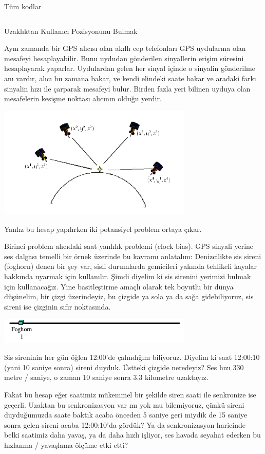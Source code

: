 \documentclass[12pt,fleqn]{article}\usepackage{../../common}
\begin{document}
Tüm kodlar

\inputminted[fontsize=\footnotesize]{python}{orbital.py}

Uzaklıktan Kullanıcı Pozisyonunu Bulmak

Aynı zamanda bir GPS alıcısı olan akıllı cep telefonları GPS uydularına
olan mesafeyi hesaplayabilir. Bunu uydudan gönderilen sinyallerin erişim
süresini hesaplayarak yaparlar. Uydulardan gelen her sinyal içinde o
sinyalin gönderilme anı vardır, alıcı bu zamana bakar, ve kendi elindeki
saate bakar ve aradaki farkı sinyalin hızı ile çarparak mesafeyi
bulur. Birden fazla yeri bilinen uyduya olan mesafelerin kesişme noktası
alıcının olduğu yerdir. 

\includegraphics[width=25em]{trilat1.png}

Yanlız bu hesap yapılırken iki potansiyel problem ortaya çıkar. 

Birinci problem alıcıdaki saat yanlılık problemi (clock bias). GPS sinyali
yerine ses dalgası temelli bir örnek üzerinde bu kavramı anlatalım:
Denizcilikte sis sireni (foghorn) denen bir şey var, sisli durumlarda
gemicileri yakında tehlikeli kayalar hakkında uyarmak için
kullanılır. Şimdi diyelim ki sis sirenini yerimizi bulmak için
kullanacağız. Yine basitleştirme amaçlı olarak tek boyutlu bir dünya
düşünelim, bir çizgi üzerindeyiz, bu çizgide ya sola ya da sağa
gidebiliyoruz, sis sireni ise çizginin sıfır noktasında.

\includegraphics[width=25em]{foghorn1.png}

Sis sireninin her gün öğlen 12:00'de çalındığını biliyoruz. Diyelim ki
saat 12:00:10 (yani 10 saniye sonra) sireni duyduk. Üstteki çizgide
neredeyiz? Ses hızı 330 metre / saniye, o zaman 10 saniye sonra 3.3
kilometre uzaktayız. 

Fakat bu hesap eğer saatimiz mükemmel bir şekilde siren saati ile
senkronize ise geçerli. Uzaktan bu senkronizasyon var mı yok mu
bilemiyoruz, çünkü sireni duyduğumuzda saate baktık acaba önceden 5 saniye
geri miydik de 15 saniye sonra gelen sireni acaba 12:00:10'da gördük?  Ya
da senkronizasyon haricinde belki saatimiz daha yavaş, ya da daha hızlı
işliyor, ses havada seyahat ederken bu hızlanma / yavaşlama ölçüme etki
etti?
\end{document}
